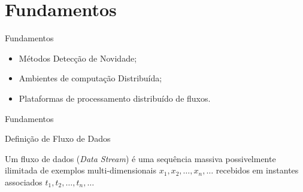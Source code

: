 \documentclass[aspectratio=43,10pt]{beamer}
\newcommand{\nota}[1]{\hspace*{-0.5cm}\textit{{\color[rgb]{1,0,0}Nota: #1}}}
\begin{document}
\section{Fundamentos}
\begin{frame}[fragile]{Fundamentos}
\begin{itemize}
  \item Métodos Detecção de Novidade;
  \item Ambientes de computação Distribuída;
  \item Plataformas de processamento distribuído de fluxos.
\end{itemize}
\end{frame}

\begin{frame}[fragile]{Fundamentos}


\begin{block}{Definição de Fluxo de Dados}
  
  \vspace{1mm}

  Um fluxo de dados (\emph{Data Stream}) é uma sequência massiva possivelmente
  ilimitada de exemplos multi-dimensionais $x_1, x_2, \dots, x_n, \dots$
  recebidos em instantes associados $t_1, t_2, \dots, t_n, \dots$

\end{block}
\end{frame}

\newcommand{\novelty}{\emph{Novelty Detection}\xspace}
\newcommand{\nd}{ND\xspace}
\newcommand{\drift}{\emph{Concept Drift}\xspace}
\newcommand{\evolution}{\emph{Concept Evolution}\xspace}
\end{document}
